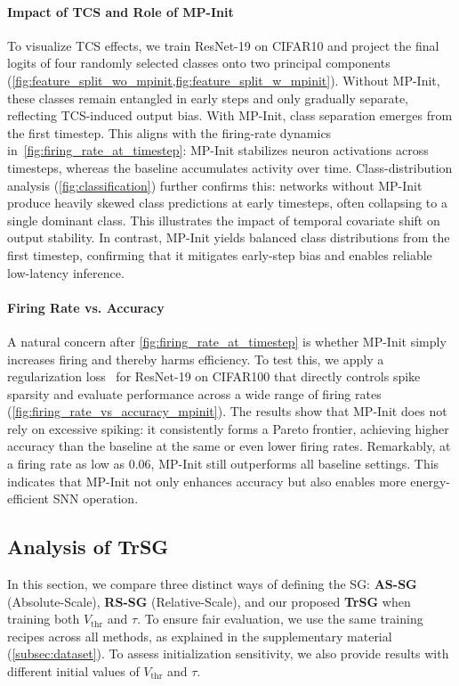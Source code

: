\paragraph{Impact of TCS and Role of MP-Init}

To visualize TCS effects, we train ResNet-19 on CIFAR10 and project the final logits of four randomly selected classes onto two principal components (\cref{fig:feature_split_wo_mpinit,fig:feature_split_w_mpinit}). Without MP-Init, these classes remain entangled in early steps and only gradually separate, reflecting TCS-induced output bias. With MP-Init, class separation emerges from the first timestep. This aligns with the firing-rate dynamics in~\cref{fig:firing_rate_at_timestep}: MP-Init stabilizes neuron activations across timesteps, whereas the baseline accumulates activity over time. Class-distribution analysis (\cref{fig:classification}) further confirms this: networks without MP-Init produce heavily skewed class predictions at early timesteps, often collapsing to a single dominant class. This illustrates the impact of temporal covariate shift on output stability. In contrast, MP-Init yields balanced class distributions from the first timestep, confirming that it mitigates early-step bias and enables reliable low-latency inference.

\paragraph{Firing Rate vs. Accuracy}
A natural concern after \cref{fig:firing_rate_at_timestep} is whether MP-Init simply increases firing and thereby harms efficiency. To test this, we apply a regularization loss~\cite{yan:2022} for ResNet-19 on CIFAR100 that directly controls spike sparsity and evaluate performance across a wide range of firing rates (\cref{fig:firing_rate_vs_accuracy_mpinit}). The results show that MP-Init does not rely on excessive spiking: it consistently forms a Pareto frontier, achieving higher accuracy than the baseline at the same or even lower firing rates. Remarkably, at a firing rate as low as 0.06, MP-Init still outperforms all baseline settings. This indicates that MP-Init not only enhances accuracy but also enables more energy-efficient SNN operation.


\subsection{Analysis of TrSG}
\label{subsec:analysis_of_ta}

In this section, we compare three distinct ways of defining the SG: \textbf{AS-SG} (Absolute-Scale), \textbf{RS-SG} (Relative-Scale), and our proposed \textbf{TrSG} when training both \(V_{\text{thr}}\) and \(\tau\). To ensure fair evaluation, we use the same training recipes across all methods, as explained in the supplementary material (\cref{subsec:dataset}). To assess initialization sensitivity, we also provide results with different initial values of \(V_{\text{thr}}\) and \(\tau\).

